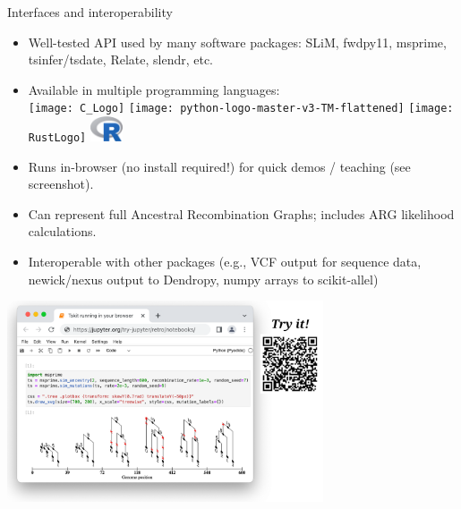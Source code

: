 \documentclass[landscape,a0paper,fontscale=0.4]{baposter}
\newcommand{\compresslist}{%
 \setlength{\itemsep}{1pt}%
 \setlength{\parskip}{0pt}%
 \setlength{\parsep}{0pt}%
 }
\begin{document}
\begin{poster}
\begin{posterbox}[name=interop,column=0,row=0,span=1]{Interfaces and interoperability}
\begin{itemize} \compresslist
    \item Well-tested API used by many software packages: SLiM, fwdpy11, msprime, tsinfer/tsdate, Relate, slendr, etc.
    \item Available in multiple programming languages: \\
        \texttt{[image: C\_Logo]}
        \texttt{[image: python-logo-master-v3-TM-flattened]}
        \texttt{[image: RustLogo]}
        \includegraphics[height=2em]{R-logo}
    \item Runs in-browser (no install required!) for quick demos / teaching (see screenshot).
    \item Can represent full Ancestral Recombination Graphs; includes ARG likelihood calculations.
    \item Interoperable with other packages (e.g., VCF output for sequence data, newick/nexus output to Dendropy, numpy arrays to scikit-allel)
\end{itemize}

% 

    \begin{center}
    \includegraphics[width=0.7\textwidth]{JupyterLite_plus_qr}
    \end{center}


\end{posterbox}


\end{poster}
\end{document}
